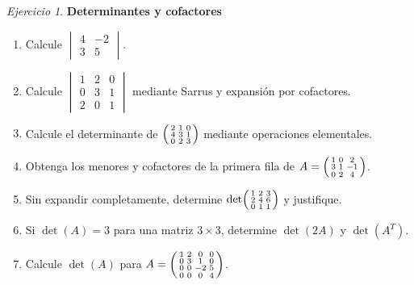 \documentclass[12pt]{article}
\theoremstyle{remark}
\newtheorem{Ejer}[definicion]{Ejercicio}
\begin{document}
\begin{Ejer}
\textbf{Determinantes y cofactores}
\begin{enumerate}[resume=banco]
\item Calcule $\begin{vmatrix}4&-2\\3&5\end{vmatrix}$.
\item Calcule $\begin{vmatrix}1&2&0\\0&3&1\\2&0&1\end{vmatrix}$ mediante Sarrus y expansión por cofactores.
\item Calcule el determinante de $\begin{psmallmatrix}2&1&0\\4&3&1\\0&2&3\end{psmallmatrix}$ mediante operaciones elementales.
\item Obtenga los menores y cofactores de la primera fila de $A=\begin{psmallmatrix}1&0&2\\3&1&-1\\0&2&4\end{psmallmatrix}$.
\item Sin expandir completamente, determine $\det\begin{psmallmatrix}1&2&3\\2&4&6\\0&1&1\end{psmallmatrix}$ y justifique.
\item Si $\det(A)=3$ para una matriz $3\times3$, determine $\det(2A)$ y $\det(A^T)$.
\item Calcule $\det(A)$ para $A=\begin{psmallmatrix}1&2&0&0\\0&3&1&0\\0&0&-2&5\\0&0&0&4\end{psmallmatrix}$.
\end{enumerate}
\end{Ejer}
\end{document}
